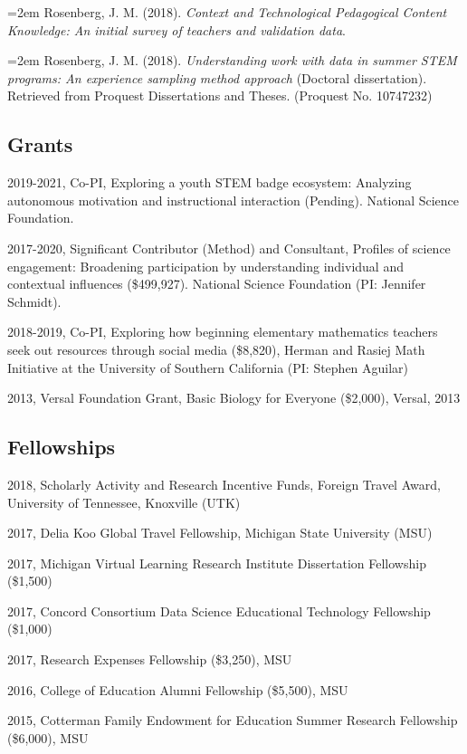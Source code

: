 \documentclass[]{article}
\begin{document}
\hangindent=2em Rosenberg, J. M. (2018). \emph{Context and Technological
Pedagogical Content Knowledge: An initial survey of teachers and
validation data}.

\hangindent=2em Rosenberg, J. M. (2018). \emph{Understanding work with
data in summer STEM programs: An experience sampling method approach}
(Doctoral dissertation). Retrieved from Proquest Dissertations and
Theses. (Proquest No. 10747232)

\subsection{Grants}\label{grants}

2019-2021, Co-PI, Exploring a youth STEM badge ecosystem: Analyzing
autonomous motivation and instructional interaction (Pending). National
Science Foundation.

2017-2020, Significant Contributor (Method) and Consultant, Profiles of
science engagement: Broadening participation by understanding individual
and contextual influences (\$499,927). National Science Foundation (PI:
Jennifer Schmidt).

2018-2019, Co-PI, Exploring how beginning elementary mathematics
teachers seek out resources through social media (\$8,820), Herman and
Rasiej Math Initiative at the University of Southern California (PI:
Stephen Aguilar)

2013, Versal Foundation Grant, Basic Biology for Everyone (\$2,000),
Versal, 2013

\subsection{Fellowships}\label{fellowships}

2018, Scholarly Activity and Research Incentive Funds, Foreign Travel
Award, University of Tennessee, Knoxville (UTK)

2017, Delia Koo Global Travel Fellowship, Michigan State University
(MSU)

2017, Michigan Virtual Learning Research Institute Dissertation
Fellowship (\$1,500)

2017, Concord Consortium Data Science Educational Technology Fellowship
(\$1,000)

2017, Research Expenses Fellowship (\$3,250), MSU

2016, College of Education Alumni Fellowship (\$5,500), MSU

2015, Cotterman Family Endowment for Education Summer Research
Fellowship (\$6,000), MSU
\end{document}

